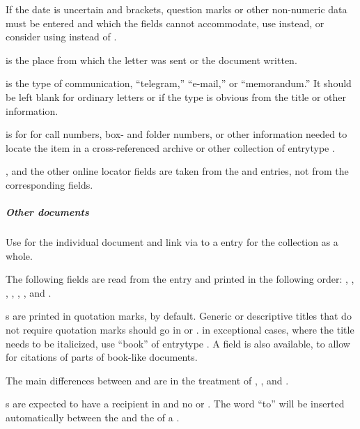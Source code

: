 \documentclass{ltxdockit}[2010/02/12]
\begin{document}
If the date is uncertain and brackets, question marks or other non-numeric data must be entered and which the  fields cannot accommodate, use  instead,\autocites[][]{1607-uncertain} or consider using  instead of . 

 is the place from which the letter was sent or the document written. 

 is the type of communication, \eg ``telegram,''  ``e-mail,'' or ``memorandum.'' It should be left blank for ordinary letters or if the type is obvious from the title or other information. 

 is for  for call numbers, box- and folder numbers, or other information needed to locate the item in a cross-referenced archive or other collection of entrytype . 

,  and the other online locator fields are taken from the  and  entries, not from the corresponding  fields.

\subparagraph{Other documents}
Use  for the individual document and link via  to a  entry for the collection as a whole. 

The following fields are read from the  entry and printed in the following order: , ,  , , , , and . 

s are printed in quotation marks, by default. Generic or descriptive titles that do not require quotation marks should go in  or . in exceptional cases, where the title needs to be italicized, use  ``book'' of entrytype . A  field is also available, to allow for citations of parts of book-like documents.

The main differences between  and  are in the treatment of , , and . 

s are expected to have a recipient in  and no  or  . The word ``to'' will be inserted automatically between the  and the  of a . 
\end{document}
